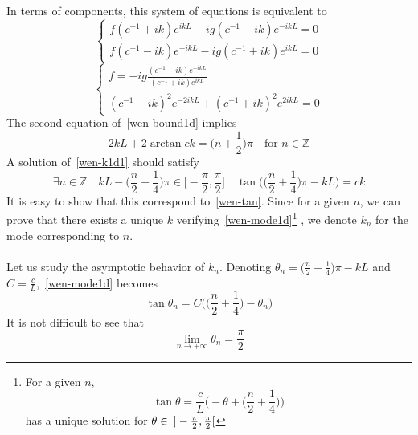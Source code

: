 In terms of components, this system of equations is equivalent to
\begin{equation*}
\begin{cases}
f(c^{-1} + ik)e^{ikL} + ig(c^{-1} - ik)e^{-ikL} = 0 \\
f(c^{-1} - ik)e^{-ikL} - ig(c^{-1}+ ik) e^{ikL} = 0
\end{cases}
\end{equation*}
\ie
\begin{equation}\label{wen-bound1d}
\begin{cases}
f = -ig \frac{(c^{-1} - ik)e^{-ikL}}{(c^{-1} + ik) e^{ikL}} \\
%
(c^{-1} - ik)^2 e^{-2ikL} + (c^{-1}+ik)^2 e^{2ikL} = 0
\end{cases}
\end{equation}
The second equation of~\cref{wen-bound1d} implies
\begin{equation}\label{wen-k1d1}
2kL + 2\arctan{ck} = \big( n +\frac 1 2 \big) \pi \quad\textrm{for $n \in \mathbb Z$}
\end{equation}
A solution of~\cref{wen-k1d1} should satisfy
\begin{equation}\label{wen-mode1d}
\exists n\in \mathbb{Z}\quad
kL - \big(\frac{n}{2} + \frac 1 4 \big) \pi \in \big[-\frac{\pi}{2}, \frac{\pi}{2}\big] \quad
\tan\Big( \big(\frac{n}{2}+\frac 1 4 \big)\pi -kL \Big) = ck
\end{equation}
It is easy to show that this correspond to~\cref{wen-tan}.
Since for a given $n$, we can prove that there exists a unique $k$ verifying~\cref{wen-mode1d}\footnote{
For a given $n$, 
\begin{equation*}
\tan \theta = \frac c L \Big( -\theta + \big( \frac n 2 + \frac 1 4 \big)\Big)
\end{equation*}
has a unique solution for $\theta \in \enskip] -\frac{\pi}{2}, \frac{\pi}{2}[$
}
, we denote $k_n$ for the mode corresponding to $n$. \\\\
Let us study the asymptotic behavior of $k_n$. 
Denoting $\theta_n = \big( \frac n 2 + \frac 1 4 \big)\pi - kL$ and $C = \frac c L$,~\cref{wen-mode1d} becomes
\begin{equation}\label{wen-modetheta}
\tan \theta_n = C \Big( \big(\frac n 2 +\frac 1 4 \big) - \theta_n \Big)
\end{equation} 
It is not difficult to see that 
\begin{equation*}
\lim_{n\rightarrow+\infty}\theta_n = \frac \pi 2
\end{equation*}
